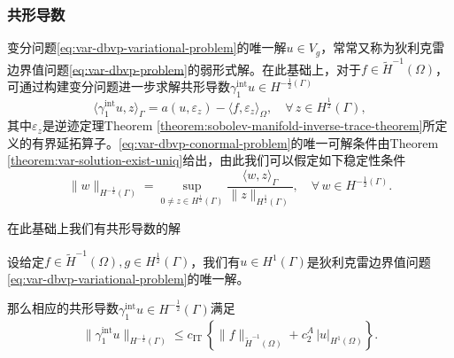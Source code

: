 \subsubsection{共形导数}
变分问题\eqref{eq:var-dbvp-variational-problem}的唯一解$u \in V_g$，常常又称为狄利克雷边界值问题\eqref{eq:var-dbvp-problem}的弱形式解。在此基础上，对于$f \in \widetilde{H}^{-1}(\Omega)$，可通过构建变分问题进一步求解共形导数$\gamma_{1}^{\text{int}} u \in H^{-\frac{1}{2}(\Gamma)}$
\begin{equation}
  \label{eq:var-dbvp-conormal-problem}
  \langle \gamma_{1}^{\text{int}} u, z \rangle _{\Gamma} = a(u,\varepsilon_z) - \langle f, \varepsilon_z \rangle_{\Omega}, \quad \forall \, z \in H^{\frac{1}{2}}(\Gamma),
\end{equation}
其中$\varepsilon_z$是逆迹定理Theorem \ref{theorem:sobolev-manifold-inverse-trace-theorem}所定义的有界延拓算子。\eqref{eq:var-dbvp-conormal-problem}的唯一可解条件由Theorem \ref{theorem:var-solution-exist-uniq}给出，由此我们可以假定如下稳定性条件
\begin{equation}
  \label{eq:var-dbvp-conormal-stability-condition}
  \big\| w \big\|_{H^{-\frac{1}{2}}(\Gamma)} = \sup_{0 \neq z \in H^{\frac{1}{2}}(\Gamma)} \frac{
  \langle w, z \rangle_{\Gamma}
  }{
  \big\| z \big\|_{H^{\frac{1}{2}}(\Gamma)}
  }, \quad \forall \, w \in H^{-\frac{1}{2}(\Gamma)}.
\end{equation}

在此基础上我们有共形导数的解
\begin{lemma}[共形导数的解]
  \label{lemma:var-dbvp-conormal-solution}
  设给定$f \in \widetilde{H}^{-1}(\Omega), g \in H^{\frac{1}{2}}(\Gamma)$，我们有$u \in H^{1}(\Gamma)$是狄利克雷边界值问题\eqref{eq:var-dbvp-variational-problem}的唯一解。

  那么相应的共形导数$\gamma_{1}^{\text{int}} u \in H^{-\frac{1}{2}}(\Gamma)$满足
  \begin{equation}
    \label{eq:var-dbvp-conormal-solution}
    \big\| \gamma_1^{\text{int}} u \big\|_{H^{-\frac{1}{2}}(\Gamma)}
    \le c_{\text{IT}} \,
    \left\{
    \big\| f \big\|_{\widetilde{H}^{-1}(\Omega)} +
    c_2^A \, \big| u \big|_{H^{1}(\Omega)}
    \right\}.
  \end{equation}
\end{lemma}


